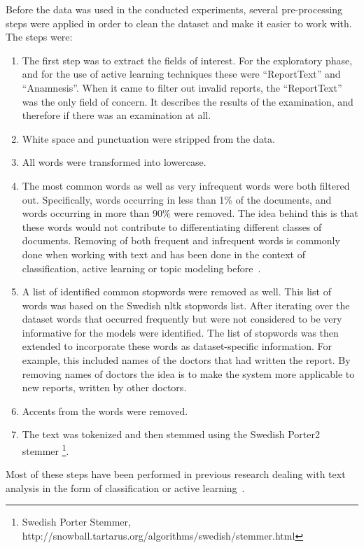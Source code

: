 Before the data was used in the conducted experiments, several pre-processing steps were applied in order to clean the dataset and make it easier to work with.
The steps were:
\begin{enumerate}
    \item The first step was to extract the fields of interest.
          For the exploratory phase, and for the use of active learning techniques these were ``ReportText'' and ``Anamnesis''.
          When it came to filter out invalid reports, the ``ReportText'' was the only field of concern.
          It describes the results of the examination, and therefore if there was an examination at all.
    \item White space and punctuation were stripped from the data.
    \item All words were transformed into lowercase.
    \item The most common words as well as very infrequent words were both filtered out.
          Specifically, words occurring in less than 1\% of the documents, and words occurring in more than 90\% were removed.
          The idea behind this is that these words would not contribute to differentiating different classes of documents.
          Removing of both frequent and infrequent words is commonly done when working with text and has been done in the context of classification, active learning or topic modeling before~\cite{tong2001support, blei2003latent, brinker2006active, sarioglu2013topic}.
    \item A list of identified common stopwords were removed as well.
          This list of words was based on the Swedish nltk stopwords list.
          After iterating over the dataset words that occurred frequently but were not considered to be very informative for the models were identified.
          The list of stopwords was then extended to incorporate these words as dataset-specific information.
          For example, this included names of the doctors that had written the report.
          By removing names of doctors the idea is to make the system more applicable to new reports, written by other doctors.
    \item Accents from the words were removed.
    \item The text was tokenized and then stemmed using the Swedish Porter2 stemmer \footnote{Swedish Porter Stemmer, http://snowball.tartarus.org/algorithms/swedish/stemmer.html}.
\end{enumerate}
Most of these steps have been performed in previous research  dealing with text analysis in the form of classification or active learning~\cite{tong2001support, blei2003latent, brinker2006active, sarioglu2013topic}.

